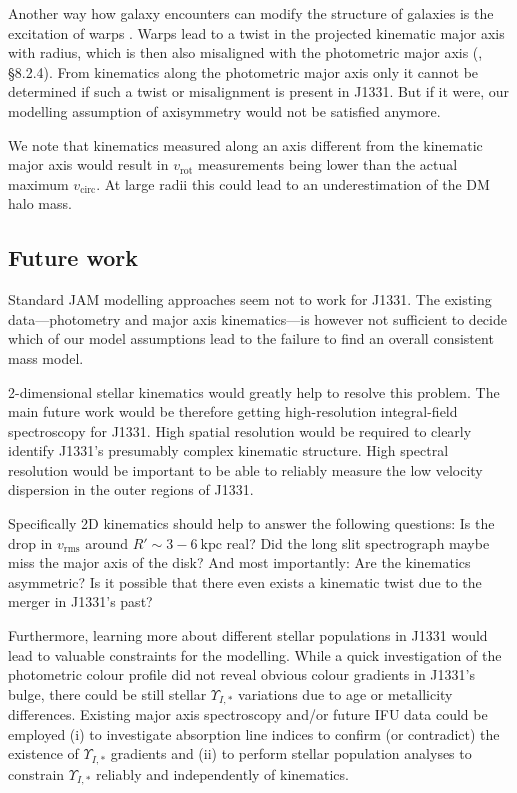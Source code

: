 \documentclass[useAMS,usenatbib]{mnras}
\begin{document}
Another way how galaxy encounters can modify the structure of galaxies is the excitation of warps \citep{1991wdir.book.....C,2013pss5.book..923S}. Warps lead to a twist in the projected kinematic major axis with radius, which is then also misaligned with the photometric major axis (\citealt{1998gaas.book.....B}, \S 8.2.4). From kinematics along the photometric major axis only it cannot be determined if such a twist or misalignment is present in J1331. But if it were, our modelling assumption of axisymmetry would not be satisfied anymore. 

We note that kinematics measured along an axis different from the kinematic major axis would result in $v_\text{rot}$ measurements being lower than the actual maximum $v_\text{circ}$. At large radii this could lead to an underestimation of the DM halo mass.

\subsection{Future work}

Standard JAM modelling approaches seem not to work for J1331. The existing data---photometry and major axis kinematics---is however not sufficient to decide which of our model assumptions lead to the failure to find an overall consistent mass model.

2-dimensional stellar kinematics would greatly help to resolve this problem. The main future work would be therefore getting high-resolution integral-field spectroscopy for J1331. High spatial resolution would be required to clearly identify J1331's presumably complex kinematic structure. High spectral resolution would be important to be able to reliably measure the low velocity dispersion in the outer regions of J1331.

Specifically 2D kinematics should help to answer the following questions: Is the drop in $v_\text{rms}$ around $R' \sim 3-6~\text{kpc}$ real? Did the long slit spectrograph maybe miss the major axis of the disk? And most importantly: Are the kinematics asymmetric? Is it possible that there even exists a kinematic twist due to the merger in J1331's past?

Furthermore, learning more about different stellar populations in J1331 would lead to valuable constraints for the modelling. While a quick investigation of the photometric colour profile did not reveal obvious colour gradients in J1331's bulge, there could be still stellar $\Upsilon_{I,*}$ variations due to age or metallicity differences. Existing major axis spectroscopy and/or future IFU data could be employed (i) to investigate absorption line indices to confirm (or contradict) the existence of $\Upsilon_{I,*}$ gradients and (ii) to perform stellar population analyses to constrain $\Upsilon_{I,*}$ reliably and independently of kinematics.
\end{document}
